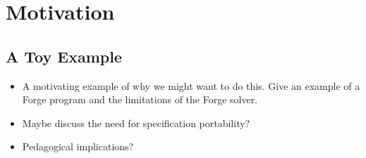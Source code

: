 \section{Motivation}



\subsection{A Toy Example}

\begin{itemize}
    \item A motivating example of why we might want to do this. Give an example of a Forge program and the limitations of the Forge solver. 
    \item Maybe discuss the need for specification portability? 
    \item Pedagogical implications? 
\end{itemize}